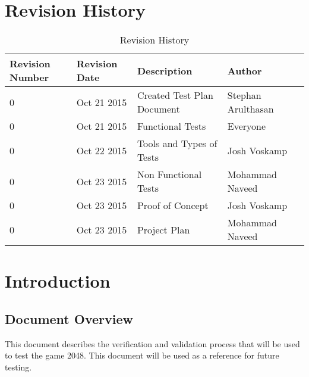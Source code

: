 \documentclass[12pt]{article}
\begin{document}
\begin{titlepage}

 

\vfill %

\end{titlepage}

\newpage
\tableofcontents
\newpage
\listoftables
\newpage

\section{Revision History}
\begin{table}[!htbp]
	\centering
    \begin{tabular}{ | p{2cm} | l| l | l |p{3cm}|}
    \hline
    Revision Number & Revision Date & Description & Author \\ \hline
    0 & Oct 21 2015 & Created Test Plan Document & Stephan Arulthasan \\ \hline
    0 & Oct 21 2015 & Functional Tests & Everyone \\ \hline
    0 & Oct 22 2015 & Tools and Types of Tests & Josh Voskamp \\ \hline
    0 & Oct 23 2015 & Non Functional Tests & Mohammad Naveed \\ \hline
    0 & Oct 23 2015 & Proof of Concept & Josh Voskamp \\ \hline
    0 & Oct 23 2015 & Project Plan & Mohammad Naveed \\ \hline
    
    \end{tabular}
    \caption{Revision History}
\end{table}


\newpage

\section{Introduction}

\subsection{Document Overview}
This document describes the verification and validation process that will be 
used to test the game 2048. This document will be used as a reference for 
future testing.
\end{document}

